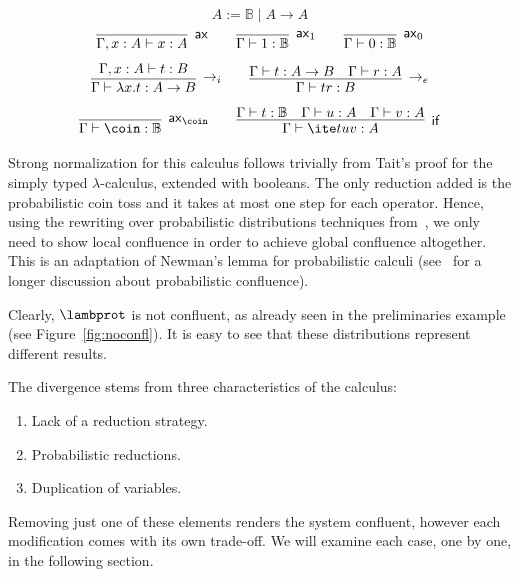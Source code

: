\begin{table}[t]
  \[
    A:= \mathbb{B}  \mid A\rightarrow A
  \]
  \[
    \infer[\mathsf{ax}]{\Gamma,x:A\vdash x:A}{} 
    \qquad
    \infer[\mathsf{ax}_1]{\Gamma\vdash 1:\mathbb{B}}{}
    \qquad
    \infer[\mathsf{ax}_0]{\Gamma\vdash 0:\mathbb{B}}{}
  \]
  \[
    \infer[\rightarrow_i]{\Gamma\vdash\lambda x.t:A\rightarrow B}
    	{\Gamma,x:A\vdash t:B}
	  \qquad 
    \infer[\rightarrow_e]{\Gamma\vdash tr:B}
    	{\Gamma\vdash t:A\rightarrow B & \Gamma\vdash r:A}
  \]
  \[
    \infer[\mathsf{ax}_{\coin}]{\Gamma\vdash \coin:\mathbb{B}}{} 
    \qquad
    \infer[\mathsf{if}]{\Gamma\vdash\ite t u v:A}{\Gamma\vdash t:\mathbb{B}& \Gamma\vdash u:A & \Gamma\vdash v:A}
  \]
  \caption{Type system for $\lambprot$.}
  \label{tab:TS}
\end{table}

Strong normalization for this calculus follows trivially from Tait's proof for the simply typed $\lambda$-calculus, extended with booleans. The only reduction added is the probabilistic coin toss and it takes at most one step for each operator. Hence, using the rewriting over probabilistic distributions techniques from~\cite{DCM17}, we only need to show local confluence in order to achieve global confluence altogether. This is an adaptation of Newman's lemma for probabilistic calculi (see~\cite{DCM17} for a longer discussion about probabilistic confluence).

Clearly, $\lambprot$ is not confluent, as already seen in the preliminaries example (see Figure~\ref{fig:noconfl}). It is easy to see that these distributions represent different results.

The divergence stems from three characteristics of the calculus:
\begin{enumerate}
  \item Lack of a reduction strategy.
  \item Probabilistic reductions.
  \item Duplication of variables.
\end{enumerate}
  
Removing just one of these elements renders the system confluent, however each modification comes with its own trade-off. We will examine each case, one by one, in the following section.

